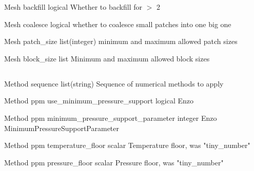 \documentclass{article}
\begin{document}
\Parameter
{Mesh}
{}
{backfill}
{logical}
{}
{Whether to backfill for  $>$ 2}
{}
{}

\Parameter
{Mesh}
{}
{coalesce}
{logical}
{}
{whether to coalesce small patches into one big one}
{}
{}

\Parameter
{Mesh}
{}
{patch\_size}
{list(integer)}
{}
{minimum and maximum allowed patch sizes}
{}
{}

\Parameter
{Mesh}
{}
{block\_size}
{list}
{}
{Minimum and maximum allowed block sizes}
{}
{}

\subsection{}

\Parameter
{Method}
{}
{sequence}
{list(string)}
{}
{Sequence of numerical methods to apply}
{}
{}

\Parameter
{Method}
{ppm}
{use\_minimum\_pressure\_support}
{logical}
{}
{Enzo }
{}
{}
 	 	 	 	
\Parameter
{Method}
{ppm}
{minimum\_pressure\_support\_parameter}
{integer}
{}
{Enzo MinimumPressureSupportParameter}
{}
{}

 	 	 	 	
\Parameter
{Method}
{ppm}
{temperature\_floor}
{scalar}
{}
{Temperature floor, was "tiny\_number"}
{}
{}

 	 	 	 	
\Parameter
{Method}
{ppm}
{pressure\_floor}
{scalar}
{}
{Pressure floor, was "tiny\_number"}
{}
{}
\end{document}

